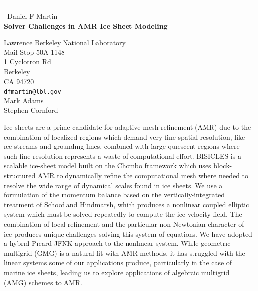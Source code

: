 \documentclass{report}
\begin{document}
\begin{center}
\rule{6in}{1pt} \
{\large Daniel F Martin \\
{\bf Solver Challenges in AMR Ice Sheet Modeling }}

Lawrence Berkeley National Laboratory \\ Mail Stop 50A-1148 \\ 1 Cyclotron Rd \\ Berkeley \\ CA 94720
\\
{\tt dfmartin@lbl.gov}\\
Mark Adams\\
Stephen Cornford\end{center}

Ice sheets are a prime candidate for adaptive mesh refinement (AMR) due
to the combination of localized regions which demand very fine spatial
resolution, like ice streams and grounding lines, combined with large
quiescent regions where such fine resolution represents a waste of
computational effort.
BISICLES is a scalable ice-sheet model built on the Chombo framework
which uses block-structured AMR to dynamically refine the computational
mesh where needed to resolve the wide range of dynamical scales found in
ice sheets.
We use a formulation of the momentum balance based on the
vertically-integrated treatment of Schoof and Hindmarsh, which produces a
nonlinear coupled elliptic system which must be solved repeatedly to
compute the ice velocity field.
The combination of local refinement and the particular non-Newtonian
character of ice produces unique challenges solving this system of
equations. We have adopted a hybrid Picard-JFNK approach to the nonlinear
system.
While geometric multigrid (GMG) is a natural fit with AMR methods, it has
struggled with the linear systems some of our applications produce,
particularly in the case of marine ice sheets, leading us to explore
applications of algebraic multigrid (AMG) schemes to AMR.
\end{document}
